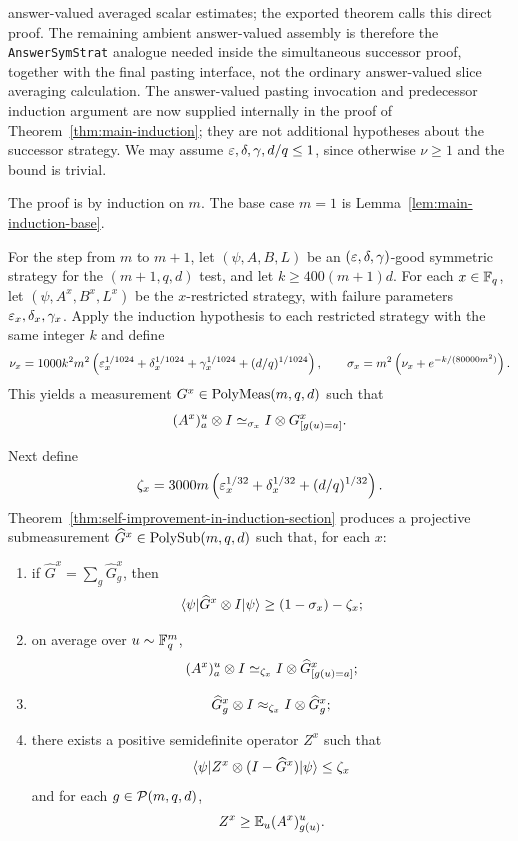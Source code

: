 	answer-valued averaged scalar estimates; the exported theorem
	calls this direct proof.
	The remaining ambient answer-valued assembly is therefore the
	\texttt{AnswerSymStrat} analogue needed inside the simultaneous successor
	proof, together with the final pasting interface, not the ordinary
	answer-valued slice averaging calculation.
	The answer-valued pasting invocation and predecessor induction argument are
	now supplied internally in the proof of Theorem~\ref{thm:main-induction};
	they are not additional hypotheses about the successor strategy.
	We may assume $\varepsilon,\delta,\gamma,d/q \le 1$, since otherwise $\nu \ge 1$ and the bound is trivial.

	The proof is by induction on $m$. The base case $m=1$ is Lemma~\ref{lem:main-induction-base}.

	For the step from $m$ to $m+1$, let $(\psi,A,B,L)$ be an $(\varepsilon,\delta,\gamma)$-good symmetric strategy for the $(m+1,q,d)$ test, and let $k \ge 400(m+1)d$. For each $x \in \mathbb{F}_q$, let $(\psi,A^x,B^x,L^x)$ be the $x$-restricted strategy, with failure parameters $\varepsilon_x,\delta_x,\gamma_x$. Apply the induction hypothesis to each restricted strategy with the same integer $k$ and define
	\[
		\nu_x = 1000k^2m^2\left(\varepsilon_x^{1/1024}+\delta_x^{1/1024}+\gamma_x^{1/1024}+(d/q)^{1/1024}\right),
		\qquad
		\sigma_x = m^2\left(\nu_x + e^{-k/(80000m^2)}\right).
	\]
	This yields a measurement $G^x \in \mathrm{PolyMeas}(m,q,d)$ such that
	\[
		(A^x)_a^u \otimes I \simeq_{\sigma_x} I \otimes G_{[g(u)=a]}^x.
	\]

	Next define
	\[
		\zeta_x = 3000m\left(\varepsilon_x^{1/32}+\delta_x^{1/32}+(d/q)^{1/32}\right).
	\]
	Theorem~\ref{thm:self-improvement-in-induction-section} produces a projective submeasurement $\widehat G^x \in \mathrm{PolySub}(m,q,d)$ such that, for each $x$:
	\begin{enumerate}
		\item if $\widehat G^x=\sum_g \widehat G_g^x$, then
		      \[
			      \langle \psi \rvert \widehat G^x \otimes I \lvert \psi \rangle \ge (1-\sigma_x)-\zeta_x;
		      \]
		\item on average over $u \sim \mathbb{F}_q^m$,
		      \[
			      (A^x)_a^u \otimes I \simeq_{\zeta_x} I \otimes \widehat G_{[g(u)=a]}^x;
		      \]
		\item
		      \[
			      \widehat G_g^x \otimes I \approx_{\zeta_x} I \otimes \widehat G_g^x;
		      \]
		\item there exists a positive semidefinite operator $Z^x$ such that
		      \[
			      \langle \psi \rvert Z^x \otimes (I-\widehat G^x) \lvert \psi \rangle \le \zeta_x
		      \]
		      and for each $g \in \mathcal{P}(m,q,d)$,
		      \[
			      Z^x \ge \mathbb{E}_u (A^x)_{g(u)}^u.
		      \]
	\end{enumerate}


